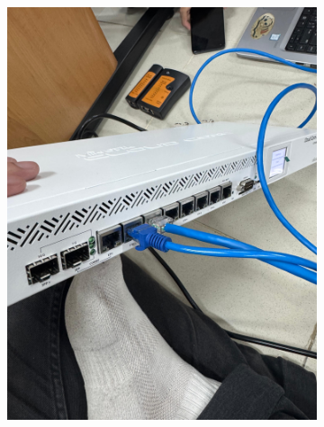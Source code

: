 \begin{figure}[H]
\begin{subfigure}[b]{0.4\linewidth}
		\includegraphics[width=\linewidth]{P2/img/dokum (2).jpg}
	\end{subfigure}
\end{figure}
